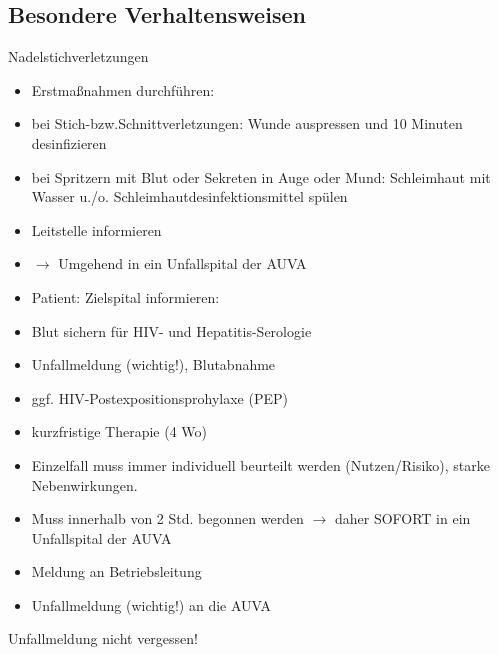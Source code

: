 \documentclass{article}
\begin{document}
\subsection{Besondere Verhaltensweisen}
%
%
Nadelstichverletzungen

\begin{itemize}
\item Erstma{\ss}nahmen durchf\"uhren: 

\end{itemize}
\begin{itemize}
\item bei Stich-bzw.Schnittverletzungen: Wunde auspressen und 10 Minuten
desinfizieren

\item bei Spritzern mit Blut oder Sekreten in Auge oder Mund:
Schleimhaut mit Wasser u./o. Schleimhautdesinfektionsmittel sp\"ulen

\end{itemize}
\begin{itemize}
\item Leitstelle informieren

\item ${\rightarrow}$ Umgehend in ein Unfallspital der AUVA

\item Patient: Zielspital informieren:

\end{itemize}
\begin{itemize}
\item Blut sichern f\"ur HIV- und Hepatitis-Serologie

\end{itemize}
\begin{itemize}
\item  Unfallmeldung  (wichtig!), Blutabnahme 

\item ggf. HIV-Postexpositionsprohylaxe (PEP)

\end{itemize}
\begin{itemize}
\item kurzfristige Therapie (4 Wo) 

\item Einzelfall muss immer individuell beurteilt werden
(Nutzen/Risiko), starke Nebenwirkungen.

\item Muss innerhalb von 2 Std. begonnen werden ${\rightarrow}$ daher
SOFORT in ein Unfallspital der AUVA

\end{itemize}
\begin{itemize}
\item Meldung an Betriebsleitung

\item Unfallmeldung (wichtig!) an die AUVA

\end{itemize}
Unfallmeldung nicht vergessen!
\end{document}
